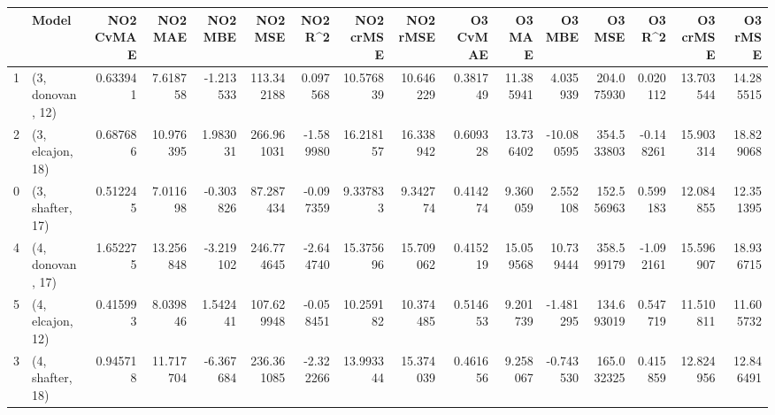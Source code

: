 \begin{tabular}{llrrrrrrrrrrrrrr}
\toprule
{} &             Model &  NO2 CvMAE &    NO2 MAE &   NO2 MBE &     NO2 MSE &   NO2 R\textasciicircum2 &  NO2 crMSE &   NO2 rMSE &  O3 CvMAE &     O3 MAE &     O3 MBE &      O3 MSE &    O3 R\textasciicircum2 &   O3 crMSE &    O3 rMSE \\
\midrule
1 &  (3, donovan, 12) &   0.633941 &   7.618758 & -1.213533 &  113.342188 &  0.097568 &  10.576839 &  10.646229 &  0.381749 &  11.385941 &   4.035939 &  204.075930 &  0.020112 &  13.703544 &  14.285515 \\
2 &  (3, elcajon, 18) &   0.687686 &  10.976395 &  1.983031 &  266.961031 & -1.589980 &  16.218157 &  16.338942 &  0.609328 &  13.736402 & -10.080595 &  354.533803 & -0.148261 &  15.903314 &  18.829068 \\
0 &  (3, shafter, 17) &   0.512245 &   7.011698 & -0.303826 &   87.287434 & -0.097359 &   9.337833 &   9.342774 &  0.414274 &   9.360059 &   2.552108 &  152.556963 &  0.599183 &  12.084855 &  12.351395 \\
4 &  (4, donovan, 17) &   1.652275 &  13.256848 & -3.219102 &  246.774645 & -2.644740 &  15.375696 &  15.709062 &  0.415219 &  15.059568 &  10.739444 &  358.599179 & -1.092161 &  15.596907 &  18.936715 \\
5 &  (4, elcajon, 12) &   0.415993 &   8.039846 &  1.542441 &  107.629948 & -0.058451 &  10.259182 &  10.374485 &  0.514653 &   9.201739 &  -1.481295 &  134.693019 &  0.547719 &  11.510811 &  11.605732 \\
3 &  (4, shafter, 18) &   0.945718 &  11.717704 & -6.367684 &  236.361085 & -2.322266 &  13.993344 &  15.374039 &  0.461656 &   9.258067 &  -0.743530 &  165.032325 &  0.415859 &  12.824956 &  12.846491 \\
\bottomrule
\end{tabular}
